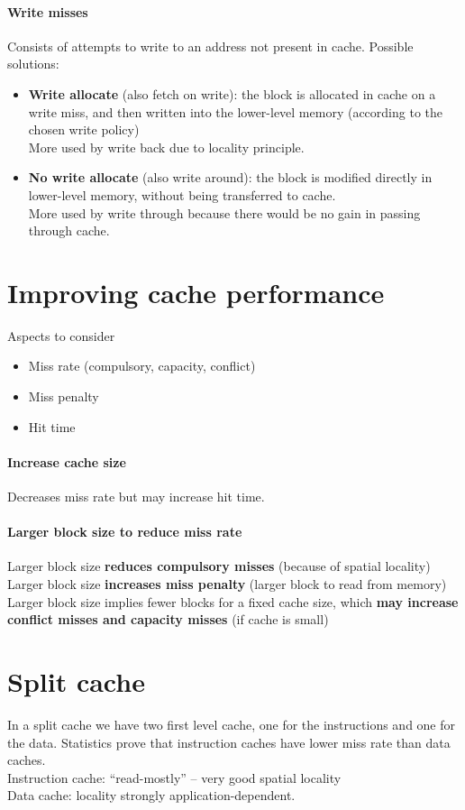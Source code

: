 \paragraph{Write misses}
Consists of attempts to write to an address not present in cache. Possible solutions:
\begin{itemize}
    \item \textbf{Write allocate} (also fetch on write):
    the block is allocated in cache on a write miss, and then written into the lower-level memory (according to the chosen write policy)\\
    More used by write back due to locality principle.
    \item \textbf{No write allocate} (also write around):
    the block is modified directly in lower-level memory, without being transferred to cache.\\
    More used by write through because there would be no gain in passing through cache.
\end{itemize}

\section{Improving cache performance}
Aspects to consider
\begin{itemize}
    \item Miss rate (compulsory, capacity, conflict)
    \item Miss penalty
    \item Hit time
\end{itemize}

\paragraph{Increase cache size}
Decreases miss rate but may increase hit time.

\paragraph{Larger block size to reduce miss rate}
Larger block size \textbf{reduces compulsory misses} (because of spatial locality)\\
Larger block size \textbf{increases miss penalty} (larger block to read from memory)\\
Larger block size implies fewer blocks for a fixed cache size, which \textbf{may increase conflict misses and capacity misses} (if cache is small)

\section{Split cache}
In a split cache we have two first level cache, one for the instructions and one for the data.
Statistics prove that instruction caches have lower miss rate than data caches.\\
Instruction cache: “read-mostly” – very good spatial locality\\
Data cache: locality strongly application-dependent.

